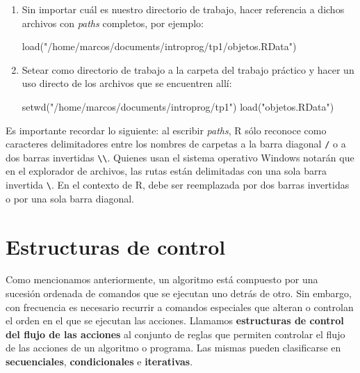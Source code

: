 \documentclass[
]{book}
\newenvironment{Shaded}{\begin{snugshade}}{\end{snugshade}}
\newcommand{\FunctionTok}[1]{\textcolor[rgb]{0.00,0.00,0.00}{#1}}
\newcommand{\NormalTok}[1]{#1}
\newcommand{\StringTok}[1]{\textcolor[rgb]{0.31,0.60,0.02}{#1}}
\begin{document}
\begin{enumerate}
\def\labelenumi{\arabic{enumi}.}
\item
  Sin importar cuál es nuestro directorio de trabajo, hacer referencia a dichos archivos con \emph{paths} completos, por ejemplo:

\begin{Shaded}
\begin{Highlighting}[]
\FunctionTok{load}\NormalTok{(}\StringTok{"/home/marcos/documents/introprog/tp1/objetos.RData"}\NormalTok{)}
\end{Highlighting}
\end{Shaded}
\item
  Setear como directorio de trabajo a la carpeta del trabajo práctico y hacer un uso directo de los archivos que se encuentren allí:

\begin{Shaded}
\begin{Highlighting}[]
\FunctionTok{setwd}\NormalTok{(}\StringTok{"/home/marcos/documents/introprog/tp1"}\NormalTok{)}
\FunctionTok{load}\NormalTok{(}\StringTok{"objetos.RData"}\NormalTok{)}
\end{Highlighting}
\end{Shaded}
\end{enumerate}

Es importante recordar lo siguiente: al escribir \emph{paths}, R sólo reconoce como caracteres delimitadores entre los nombres de carpetas a la barra diagonal \texttt{/} o a dos barras invertidas \texttt{\textbackslash{}\textbackslash{}}. Quienes usan el sistema operativo Windows notarán que en el explorador de archivos, las rutas están delimitadas con una sola barra invertida \texttt{\textbackslash{}}. En el contexto de R, debe ser reemplazada por dos barras invertidas o por una sola barra diagonal.

\hypertarget{estructuras-de-control}{%
\chapter{Estructuras de control}\label{estructuras-de-control}}

Como mencionamos anteriormente, un algoritmo está compuesto por una sucesión ordenada de comandos que se ejecutan uno detrás de otro. Sin embargo, con frecuencia es necesario recurrir a comandos especiales que alteran o controlan el orden en el que se ejecutan las acciones. Llamamos \textbf{estructuras de control del flujo de las acciones} al conjunto de reglas que permiten controlar el flujo de las acciones de un algoritmo o programa. Las mismas pueden clasificarse en \textbf{secuenciales}, \textbf{condicionales} e \textbf{iterativas}.
\end{document}
